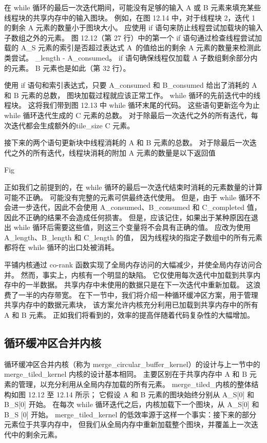 在 while 循环的最后一次迭代期间，可能没有足够的输入 $\mathrm{A}$ 或 B 元素来填充某些线程块的共享内存中的输入图块。 
例如，在图 12.14 中，对于线程块 2，迭代 1 的剩余 A 元素的数量小于图块大小。 
应使用 if 语句来防止线程尝试加载块的输入子数组之外的元素。 
图 12.12（第 27 行）中的第一个 if 语句通过检查线程尝试加载的 A\_S 元素的索引是否超过表达式 A\ 的值给出的剩余 A 元素的数量来检测此类尝试。 \_length - A\_consumed。 if 语句确保线程仅加载 A 子数组剩余部分内的元素。 
B 元素也是如此（第 32 行）。

使用 if 语句和索引表达式，只要 A\_consumed 和 B\_consumed 给出了消耗的 $\mathrm{A}$ 和 $\mathrm{B}$ 元素的总数，
图块加载过程就应该正常工作。 while 循环的先前迭代中的线程块。 这将我们带到图 12.13 中 while 循环末尾的代码。 
这些语句更新迄今为止 while 循环迭代生成的 $\mathrm{C}$ 元素的总数。 
对于除最后一次迭代之外的所有迭代，每次迭代都会生成额外的tile\_size C 元素。

接下来的两个语句更新块中线程消耗的 A 和 B 元素的总数。 
对于除最后一次迭代之外的所有迭代，线程块消耗的附加 A 元素的数量是以下返回值

{\color{red} Fig}

正如我们之前提到的，在 while 循环的最后一次迭代结束时消耗的元素数量的计算可能不正确。 
可能没有完整的元素可供最终迭代使用。 
但是，由于 while 循环不会进一步迭代，因此不会使用 A\_consumed、B\_consumed 和 C\_completed 值，
因此不正确的结果不会造成任何损害。 
但是，应该记住，如果出于某种原因在退出 while 循环后需要这些值，则这三个变量将不会具有正确的值。 
应改为使用 A\_length、B\_length 和 C\_length 的值，
因为线程块的指定子数组中的所有元素都将在 while 循环的出口处被消耗。

平铺内核通过 co-rank 函数实现了全局内存访问的大幅减少，并使全局内存访问合并。 
然而，事实上，内核有一个明显的缺陷。 它仅使用每次迭代中加载到共享内存中的一半数据。 
共享内存中未使用的数据只是在下一次迭代中重新加载。 这浪费了一半的内存带宽。 
在下一节中，我们将介绍一种循环缓冲区方案，用于管理共享内存中的数据元素块，
该方案允许内核充分利用已加载到共享内存中的所有 A 和 B 元素。 正如我们将看到的，效率的提高伴随着代码复杂性的大幅增加。

\subsection{循环缓冲区合并内核}
循环缓冲区合并内核（称为 merge\_circular\_buffer\_kernel）的设计与上一节中的 merge\_tiled\_kernel 内核的设计基本相同。 
主要区别在于共享内存中 $\mathrm{A}$ 和 $\mathrm{B}$ 元素的管理，以充分利用从全局内存加载的所有元素。 
merge\_tiled\_内核的整体结构如图 12.12 至 12.14 所示； 
它假设 A 和 B 元素的图块始终分别从 A\_S[0] 和 B\_S[0] 开始。 
在每次 while 循环迭代之后，内核加载下一个图块，从 A\_S[0] 和 B\_S [0] 开始。 
merge\_tiled\_kernel 的低效率源于这样一个事实：接下来的部分元素位于共享内存中，
但我们从全局内存中重新加载整个图块，并覆盖上一次迭代中的剩余元素。

